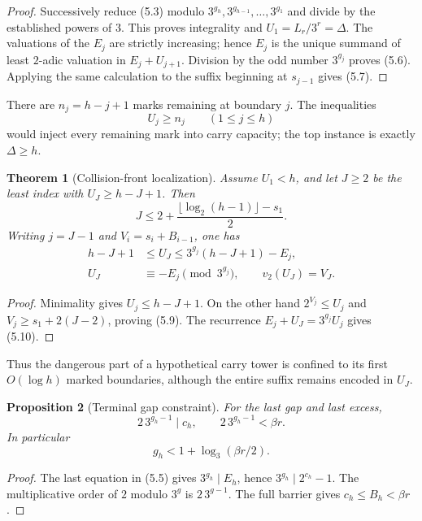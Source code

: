 \documentclass[11pt,reqno]{amsart}
\newtheorem{theorem}{Theorem}[section]
\newtheorem{proposition}[theorem]{Proposition}
\theoremstyle{remark}
\newcommand{\vtwo}{v_2}
\begin{document}
\begin{proof}
Successively reduce (5.3) modulo
$3^{g_h},3^{g_{h-1}},\ldots,3^{g_1}$ and divide by the established powers
of $3$.  This proves integrality and $U_1=L_r/3^r=\Delta$.
The valuations of the $E_j$ are strictly increasing; hence $E_j$ is the
unique summand of least $2$-adic valuation in $E_j+U_{j+1}$.  Division by
the odd number $3^{g_j}$ proves (5.6).  Applying the same calculation to
the suffix beginning at $s_{j-1}$ gives (5.7).
\end{proof}

There are $n_j=h-j+1$ marks remaining at boundary $j$.  The inequalities
\[
 U_j\ge n_j\qquad(1\le j\le h)                       \tag{5.8}
\]
would inject every remaining mark into carry capacity; the top instance is
exactly $\Delta\ge h$.

\begin{theorem}[Collision-front localization]\label{thm:front}
Assume $U_1<h$, and let $J\ge2$ be the least index with
$U_J\ge h-J+1$.  Then
\[
 J\le2+\frac{\lfloor\log_2(h-1)\rfloor-s_1}{2}.      \tag{5.9}
\]
Writing $j=J-1$ and $V_i=s_i+B_{i-1}$, one has
\begin{align*}
 h-J+1&\le U_J\le3^{g_j}(h-J+1)-E_j,\\
 U_J&\equiv-E_j\pmod{3^{g_j}},\qquad
 \vtwo(U_J)=V_J.                                     \tag{5.10}
\end{align*}
\end{theorem}

\begin{proof}
Minimality gives $U_j\le h-J+1$.  On the other hand
$2^{V_j}\le U_j$ and
$V_j\ge s_1+2(J-2)$, proving (5.9).  The recurrence
$E_j+U_J=3^{g_j}U_j$ gives (5.10).
\end{proof}

Thus the dangerous part of a hypothetical carry tower is confined to its
first $O(\log h)$ marked boundaries, although the entire suffix remains
encoded in $U_J$.

\begin{proposition}[Terminal gap constraint]\label{prop:lastgap}
For the last gap and last excess,
\[
 2\,3^{g_h-1}\mid c_h,\qquad
 2\,3^{g_h-1}<\beta r.                                \tag{5.11}
\]
In particular
\[
 g_h<1+\log_3(\beta r/2).
\]
\end{proposition}

\begin{proof}
The last equation in (5.5) gives
$3^{g_h}\mid E_h$, hence $3^{g_h}\mid2^{c_h}-1$.
The multiplicative order of $2$ modulo $3^g$ is $2\,3^{g-1}$.
The full barrier gives $c_h\le B_h<\beta r$.
\end{proof}
\end{document}

